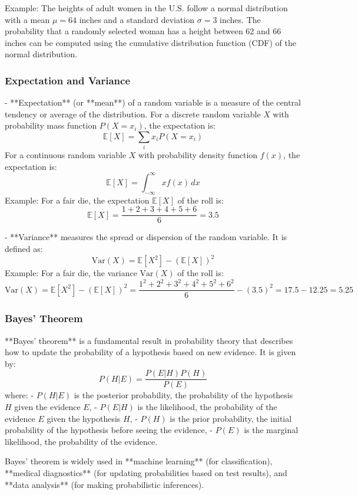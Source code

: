 \documentclass{article}
\begin{document}
   Example: The heights of adult women in the U.S. follow a normal distribution with a mean \( \mu = 64 \) inches and a standard deviation \( \sigma = 3 \) inches. The probability that a randomly selected woman has a height between 62 and 66 inches can be computed using the cumulative distribution function (CDF) of the normal distribution.

\subsubsection*{Expectation and Variance}

- **Expectation** (or **mean**) of a random variable is a measure of the central tendency or average of the distribution. For a discrete random variable \( X \) with probability mass function \( P(X = x_i) \), the expectation is:
  \[
  \mathbb{E}[X] = \sum_{i} x_i P(X = x_i)
  \]
  For a continuous random variable \( X \) with probability density function \( f(x) \), the expectation is:
  \[
  \mathbb{E}[X] = \int_{-\infty}^{\infty} x f(x) \, dx
  \]
  Example: For a fair die, the expectation \( \mathbb{E}[X] \) of the roll is:
  \[
  \mathbb{E}[X] = \frac{1 + 2 + 3 + 4 + 5 + 6}{6} = 3.5
  \]

- **Variance** measures the spread or dispersion of the random variable. It is defined as:
  \[
  \text{Var}(X) = \mathbb{E}[X^2] - (\mathbb{E}[X])^2
  \]
  Example: For a fair die, the variance \( \text{Var}(X) \) of the roll is:
  \[
  \text{Var}(X) = \mathbb{E}[X^2] - (\mathbb{E}[X])^2 = \frac{1^2 + 2^2 + 3^2 + 4^2 + 5^2 + 6^2}{6} - (3.5)^2 = 17.5 - 12.25 = 5.25
  \]

\subsubsection*{Bayes' Theorem}

**Bayes' theorem** is a fundamental result in probability theory that describes how to update the probability of a hypothesis based on new evidence. It is given by:
\[
P(H | E) = \frac{P(E | H) P(H)}{P(E)}
\]
where:
- \( P(H | E) \) is the posterior probability, the probability of the hypothesis \( H \) given the evidence \( E \),
- \( P(E | H) \) is the likelihood, the probability of the evidence \( E \) given the hypothesis \( H \),
- \( P(H) \) is the prior probability, the initial probability of the hypothesis before seeing the evidence,
- \( P(E) \) is the marginal likelihood, the probability of the evidence.

Bayes' theorem is widely used in **machine learning** (for classification), **medical diagnostics** (for updating probabilities based on test results), and **data analysis** (for making probabilistic inferences).
\end{document}
